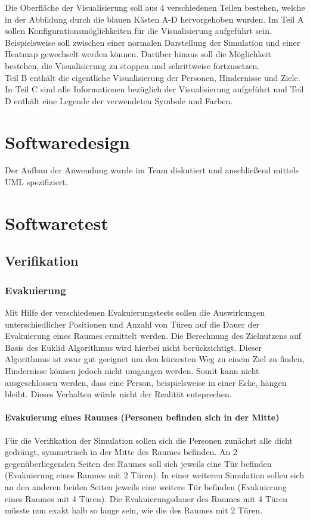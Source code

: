 Die Oberfläche der Visualisierung soll aus 4 verschiedenen Teilen bestehen, welche in der Abbildung durch die blauen Kästen A-D hervorgehoben wurden. Im Teil A sollen Konfigurationsmöglichkeiten für die Visualisierung aufgeführt sein. Beispielsweise soll zwischen einer normalen Darstellung der Simulation und einer Heatmap gewechselt werden können. Darüber hinaus soll die Möglichkeit bestehen, die Visualisierung zu stoppen und schrittweise fortzusetzen. \\
Teil B enthält die eigentliche Visualisierung der Personen, Hindernisse und Ziele. In Teil C sind alle Informationen bezüglich der Visualisierung aufgeführt und Teil D enthält eine Legende der verwendeten Symbole und Farben.

\section{Softwaredesign}

Der Aufbau der Anwendung wurde im Team diskutiert und anschließend mittels UML spezifiziert.


\section{Softwaretest}





\subsection{Verifikation}

\subsubsection{Evakuierung}
Mit Hilfe der verschiedenen Evakuierungstests sollen die Auswirkungen unterschiedlicher Positionen und Anzahl von Türen auf die Dauer der Evakuierung eines Raumes ermittelt werden. Die Berechnung des Zielnutzens auf Basis des Euklid Algorithmus wird hierbei nicht berücksichtigt. Dieser Algorithmus ist zwar gut geeignet um den kürzesten Weg zu einem Ziel zu finden, Hindernisse können jedoch nicht umgangen werden. Somit kann nicht ausgeschlossen werden, dass eine Person, beispielsweise in einer Ecke, \glqq hängen bleibt\grqq. Dieses Verhalten würde nicht der Realität entsprechen.

\paragraph{Evakuierung eines Raumes (Personen befinden sich in der Mitte)}
\label{EvaVerifikation}
Für die Verifikation der Simulation sollen sich die Personen zunächst alle dicht gedrängt, symmetrisch in der Mitte des Raumes befinden. An 2 gegenüberliegenden Seiten des Raumes soll sich jeweils eine Tür befinden (Evakuierung eines Raumes mit 2 Türen). In einer weiteren Simulation sollen sich an den anderen beiden Seiten jeweils eine weitere Tür befinden (Evakuierung eines Raumes mit 4 Türen). Die Evakuierungsdauer des Raumes mit 4 Türen müsste nun exakt halb so lange sein, wie die des Raumes mit 2 Türen. \\ 

